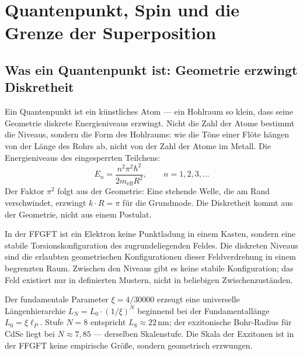 \chapter{Quantenpunkt, Spin und die Grenze der Superposition}
\label{ch:spin}

\section{Was ein Quantenpunkt ist: Geometrie erzwingt Diskretheit}

Ein Quantenpunkt ist ein künstliches Atom --- ein Hohlraum so klein,
dass seine Geometrie diskrete Energieniveaus erzwingt. Nicht die Zahl
der Atome bestimmt die Niveaus, sondern die Form des Hohlraums: wie die
Töne einer Flöte hängen von der Länge des Rohrs ab, nicht von der Zahl
der Atome im Metall. Die Energieniveaus des eingesperrten Teilchens:
\begin{equation}
  E_n = \frac{n^2\pi^2\hbar^2}{2m_{\mathrm{eff}}R^2},\qquad n = 1,2,3,\dots
\end{equation}
Der Faktor $\pi^2$ folgt aus der Geometrie: Eine stehende Welle, die am
Rand verschwindet, erzwingt $k\cdot R = \pi$ für die Grundmode. Die
Diskretheit kommt aus der Geometrie, nicht aus einem Postulat.

In der FFGFT ist ein Elektron keine Punktladung in einem Kasten, sondern
eine stabile Torsionskonfiguration des zugrundeliegenden Feldes. Die
diskreten Niveaus sind die erlaubten geometrischen Konfigurationen dieser
Feldverdrehung in einem begrenzten Raum. Zwischen den Niveaus gibt es
keine stabile Konfiguration; das Feld existiert nur in definierten
Mustern, nicht in beliebigen Zwischenzuständen.

Der fundamentale Parameter $\xi = 4/30000$ erzeugt eine universelle
Längenhierarchie $L_N = L_0\cdot(1/\xi)^N$ beginnend bei der
Fundamentallänge $L_0 = \xi\ell_P$. Stufe $N = 8$ entspricht
$L_8\approx22$\,nm; der exzitonische Bohr-Radius für CdSe liegt
bei $N\approx7{,}85$ --- derselben Skalenstufe. Die Skala der Exzitonen
ist in der FFGFT keine empirische Größe, sondern geometrisch
erzwungen.

